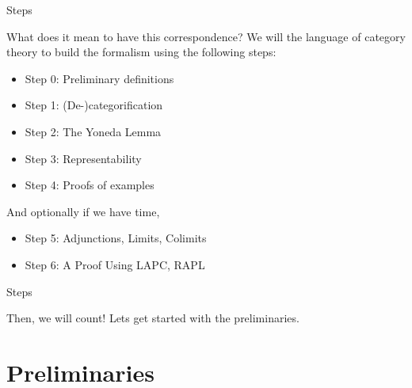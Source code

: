 \documentclass[tikz]{beamer}
\theoremstyle{definition}
\begin{document}
\begin{frame}{Steps}

    What does it mean to have this correspondence? We will the language of category theory to build the formalism using the following steps:

\begin{itemize}
    \item Step 0: Preliminary definitions
    \item Step 1: (De-)categorification
    \item Step 2: The Yoneda Lemma
    \item Step 3: Representability
    \item Step 4: Proofs of examples
\end{itemize}

And optionally if we have time,
\begin{itemize}
    \item Step 5: Adjunctions, Limits, Colimits
    \item Step 6: A Proof Using LAPC, RAPL
\end{itemize}
\end{frame}

\begin{frame}{Steps}

    Then, we will count! Lets get started with the preliminaries.
\end{frame}

\section{Preliminaries}
\end{document}

